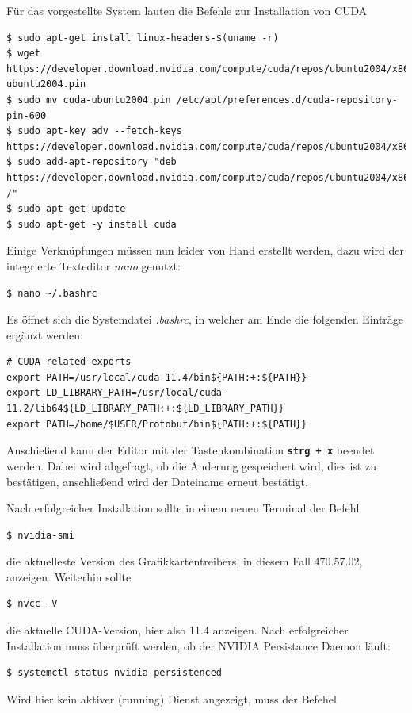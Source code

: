 \documentclass[12pt, oneside]{article}
\begin{document}
Für das vorgestellte System lauten die Befehle zur Installation von CUDA

\begin{verbatim}
$ sudo apt-get install linux-headers-$(uname -r)	
$ wget https://developer.download.nvidia.com/compute/cuda/repos/ubuntu2004/x86_64/cuda-ubuntu2004.pin
$ sudo mv cuda-ubuntu2004.pin /etc/apt/preferences.d/cuda-repository-pin-600
$ sudo apt-key adv --fetch-keys https://developer.download.nvidia.com/compute/cuda/repos/ubuntu2004/x86_64/7fa2af80.pub
$ sudo add-apt-repository "deb https://developer.download.nvidia.com/compute/cuda/repos/ubuntu2004/x86_64/ /"
$ sudo apt-get update
$ sudo apt-get -y install cuda
\end{verbatim}
Einige Verknüpfungen müssen nun leider von Hand erstellt werden, dazu wird der integrierte Texteditor \textit{nano} genutzt:

\begin{verbatim}
$ nano ~/.bashrc
\end{verbatim}
Es öffnet sich die Systemdatei \textit{.bashrc}, in welcher am Ende die folgenden Einträge ergänzt werden:


\begin{verbatim}
# CUDA related exports
export PATH=/usr/local/cuda-11.4/bin${PATH:+:${PATH}}
export LD_LIBRARY_PATH=/usr/local/cuda-11.2/lib64${LD_LIBRARY_PATH:+:${LD_LIBRARY_PATH}}
export PATH=/home/$USER/Protobuf/bin${PATH:+:${PATH}}
\end{verbatim}
Anschießend kann der Editor mit der Tastenkombination \textbf{\texttt{strg + x}} beendet werden. Dabei wird abgefragt, ob die Änderung gespeichert wird, dies ist zu bestätigen, anschließend wird der Dateiname erneut bestätigt.

Nach erfolgreicher Installation sollte in einem neuen Terminal der Befehl


\begin{verbatim}
$ nvidia-smi
\end{verbatim}
die aktuelleste Version des Grafikkartentreibers, in diesem Fall 470.57.02, anzeigen. Weiterhin sollte

\begin{verbatim}
$ nvcc -V
\end{verbatim}
die aktuelle CUDA-Version, hier also 11.4 anzeigen. Nach erfolgreicher Installation muss überprüft werden, ob der NVIDIA Persistance Daemon läuft:

\begin{verbatim}
$ systemctl status nvidia-persistenced
\end{verbatim}
Wird hier kein aktiver (running) Dienst angezeigt, muss der Befehel
\end{document}
